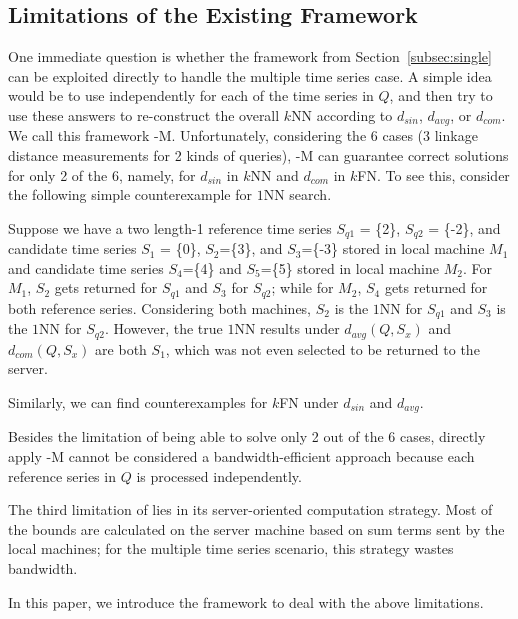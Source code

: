 \vspace{-0.1in}
\subsection{Limitations of the Existing Framework}
\label{subsec:limitations}

One immediate question is whether the \LeeWave{} framework from
Section~\ref{subsec:single} can be exploited directly to handle the
multiple time series case.  A simple idea would be to use \LeeWave{}
independently for each of the time series in $Q$, and then try to use
these answers to re-construct the overall $k$NN according to
$d_{sin}$, $d_{avg}$, or $d_{com}$.  We call this framework
\LeeWave-M{}. Unfortunately, considering the 6 cases (3 linkage distance measurements for 
2 kinds of queries), \LeeWave-M{} can guarantee correct
solutions for only 2 of the 6, namely, for $d_{sin}$ in $k$NN and
$d_{com}$ in $k$FN.  To see this, consider the following simple counterexample
for $1$NN search.
\begin{example}
Suppose we have a two length-1 reference time series $S_{q1}$ = \{2\},
$S_{q2}$ = \{-2\}, and candidate time series $S_1$ = \{0\},
$S_2$=\{3\}, and $S_3$=\{-3\} stored in local machine $M_1$ and
candidate time series $S_4$=\{4\} and $S_5$=\{5\} stored in local
machine $M_2$. For $M_1$, $S_2$ gets returned for $S_{q1}$ and $S_3$
for $S_{q2}$; while for $M_2$, $S_4$ gets returned for both reference
series. Considering both machines, $S_2$ is the $1$NN for $S_{q1}$ and
$S_3$ is the $1$NN for $S_{q2}$.  However, the true $1$NN results
under $d_{avg}(Q, S_x)$ and $d_{com}(Q, S_x)$ are both $S_1$, which
was not even selected to be returned to the server.
\end{example}

Similarly, we can find counterexamples for $k$FN under $d_{sin}$ and $d_{avg}$.

Besides the limitation of being able to solve only 2 out of the 6
cases, directly apply \LeeWave-M{} cannot be considered a
bandwidth-efficient approach because each reference series in $Q$ is
processed independently.

The third limitation of \LeeWave{} lies in its server-oriented
computation strategy.  Most of the bounds are calculated on the server
machine based on sum terms sent by the local machines; for the multiple
time series scenario, this strategy wastes bandwidth.

In this paper, we introduce the \MSWave{} framework to deal with the
above limitations.

